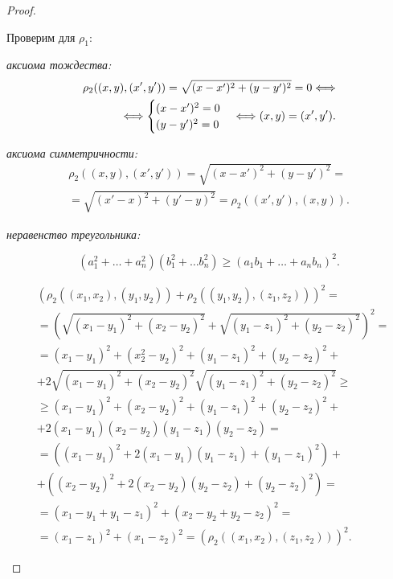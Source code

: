 \documentclass[10pt]{article}
\begin{document}
\begin{tasks}
\begin{proof}
\begin{conditions}
            \item Проверим для $\rho_1$: \begin{conditions}
                \item \textit{аксиома тождества:}\begin{align*}
                    \rho_2((x,y), (x',y')) = \sqrt{(x-x')^2+(y-y')^2} = 0 \Longleftrightarrow\\\Longleftrightarrow \begin{cases}
                        (x-x')^2 = 0\\
                        (y-y')^2 = 0
                    \end{cases} \Longleftrightarrow (x, y) = (x', y').
                \end{align*}
                \item \textit{аксиома симметричности:}
                \begin{align*}
                    \rho_2((x,y),(x',y')) = \sqrt{(x-x')^2+(y-y')^2} =\\= \sqrt{(x'-x)^2+(y'-y)^2} = \rho_2((x',y'),(x,y)).
                \end{align*}
                \item \textit{неравенство треугольника:}

                \begin{theorem}
                    \[
                    (a_1^2+\ldots+a_n^2)(b_1^2+\ldots b_n^2) \geq (a_1b_1+\ldots+a_nb_n)^2.
                    \]
                \end{theorem}
                
                \begin{align*}
                    &(\rho_2((x_1,x_2),(y_1,y_2)) + \rho_2((y_1, y_2),(z_1, z_2)))^2 =\\
                    &= \left(\sqrt{(x_1-y_1)^2+(x_2-y_2)^2} + \sqrt{(y_1-z_1)^2+(y_2-z_2)^2}\right)^2 = \\[2mm] 
                    &=(x_1-y_1)^2 + (x_2^2-y_2)^2 + (y_1-z_1)^2+(y_2-z_2)^2+\\
                    &+2\sqrt{(x_1-y_1)^2+(x_2-y_2)^2}\sqrt{(y_1-z_1)^2+(y_2-z_2)^2}\geq\\[2mm]
                    &\geq(x_1-y_1)^2 + (x_2-y_2)^2 + (y_1-z_1)^2+(y_2-z_2)^2+\\
                    &+2(x_1-y_1)(x_2-y_2)(y_1-z_1)(y_2-z_2)=\\[2mm]
                    &=((x_1-y_1)^2+2(x_1-y_1)(y_1-z_1)+(y_1-z_1)^2)+\\
                    &+((x_2-y_2)^2+2(x_2-y_2)(y_2-z_2)+(y_2-z_2)^2)=\\[2mm]
                    &=(x_1-y_1+y_1-z_1)^2+(x_2-y_2+y_2-z_2)^2=\\
                    &=(x_1-z_1)^2+(x_1-z_2)^2 = (\rho_2((x_1, x_2), (z_1,z_2)))^2.
                \end{align*}


\end{conditions}
\end{conditions}
\end{proof}
\end{tasks}
\end{document}
